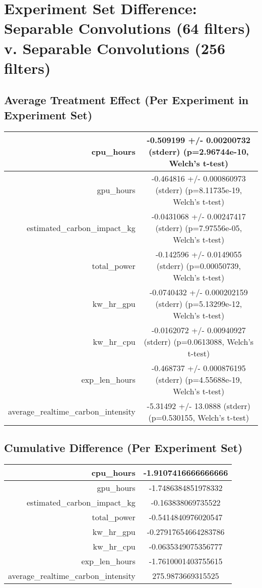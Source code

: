 \documentclass{article}%
\begin{document}
%
\normalsize%
\section{Experiment Set Difference: Separable Convolutions (64 filters) v. Separable Convolutions (256 filters)}%
\label{sec:Experiment Set Difference Separable Convolutions (64 filters) v. Separable Convolutions (256 filters)}%
\subsection{Average Treatment Effect (Per Experiment in Experiment Set)}%
\label{subsec:Average Treatment Effect (Per Experiment in Experiment Set)}%
\begin{tabular}{|r|c|}%
\hline%
cpu\_hours&{-}0.509199 +/{-} 0.00200732 (stderr) (p=2.96744e{-}10, Welch's t{-}test)\\%
\hline%
gpu\_hours&{-}0.464816 +/{-} 0.000860973 (stderr) (p=8.11735e{-}19, Welch's t{-}test)\\%
\hline%
estimated\_carbon\_impact\_kg&{-}0.0431068 +/{-} 0.00247417 (stderr) (p=7.97556e{-}05, Welch's t{-}test)\\%
\hline%
total\_power&{-}0.142596 +/{-} 0.0149055 (stderr) (p=0.00050739, Welch's t{-}test)\\%
\hline%
kw\_hr\_gpu&{-}0.0740432 +/{-} 0.000202159 (stderr) (p=5.13299e{-}12, Welch's t{-}test)\\%
\hline%
kw\_hr\_cpu&{-}0.0162072 +/{-} 0.00940927 (stderr) (p=0.0613088, Welch's t{-}test)\\%
\hline%
exp\_len\_hours&{-}0.468737 +/{-} 0.000876195 (stderr) (p=4.55688e{-}19, Welch's t{-}test)\\%
\hline%
average\_realtime\_carbon\_intensity&{-}5.31492 +/{-} 13.0888 (stderr) (p=0.530155, Welch's t{-}test)\\%
\hline%
\end{tabular}

%
\subsection{Cumulative Difference (Per Experiment Set)}%
\label{subsec:Cumulative Difference (Per Experiment Set)}%
\begin{tabular}{|r|c|}%
\hline%
cpu\_hours&{-}1.9107416666666666\\%
\hline%
gpu\_hours&{-}1.7486384851978332\\%
\hline%
estimated\_carbon\_impact\_kg&{-}0.163838069735522\\%
\hline%
total\_power&{-}0.5414840976020547\\%
\hline%
kw\_hr\_gpu&{-}0.27917654664283786\\%
\hline%
kw\_hr\_cpu&{-}0.0635349075356777\\%
\hline%
exp\_len\_hours&{-}1.7610001403755615\\%
\hline%
average\_realtime\_carbon\_intensity&275.9873669315525\\%
\hline%
\end{tabular}

%
\end{document}

